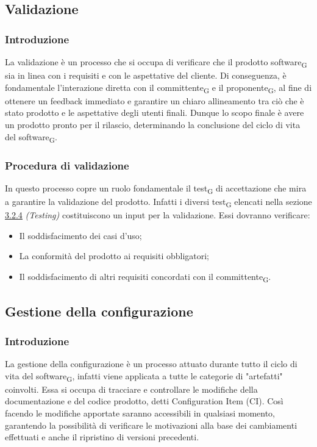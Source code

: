 \subsection{Validazione}
\subsubsection{Introduzione}
La validazione è un processo che si occupa di verificare che il prodotto {software\textsubscript{G}} sia in linea con i requisiti
e con le aspettative del cliente. Di conseguenza, è fondamentale l'interazione diretta con il {committente\textsubscript{G}} e il
{proponente\textsubscript{G}}, al fine di ottenere un feedback immediato e garantire un chiaro allineamento tra ciò che è stato
prodotto e le aspettative degli utenti finali. Dunque lo scopo finale è avere un prodotto pronto per il rilascio, determinando la 
conclusione del ciclo di vita del {software\textsubscript{G}}.

\subsubsection{Procedura di validazione}
In questo processo copre un ruolo fondamentale il {test\textsubscript{G}} di accettazione che mira a garantire la validazione
del prodotto. Infatti i diversi {test\textsubscript{G}} elencati nella sezione \href{#testing}{\underline{3.2.4}} \textit{(Testing)} costituiscono un input
per la validazione. Essi dovranno verificare:
\begin{itemize}
    \item Il soddisfacimento dei casi d'uso;
    \item La conformità del prodotto ai requisiti obbligatori;
    \item Il soddisfacimento di altri requisiti concordati con il {committente\textsubscript{G}}.
\end{itemize}

\subsection{Gestione della configurazione}
\subsubsection{Introduzione}
La gestione della configurazione è un processo attuato durante tutto il ciclo di vita del {software\textsubscript{G}}, infatti viene
applicata a tutte le categorie di "artefatti" coinvolti. Essa si occupa di tracciare e controllare le modifiche della documentazione e del codice
prodotto, detti Configuration Item (CI). Così facendo le modifiche apportate saranno accessibili in qualsiasi momento, garantendo la
possibilità di verificare le motivazioni alla base dei cambiamenti effettuati e anche il ripristino di versioni precedenti.


